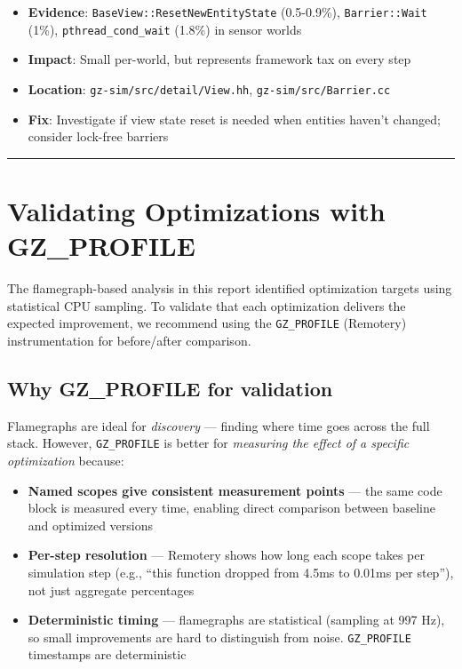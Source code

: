 \documentclass[11pt, a4paper]{article}
\providecommand{\tightlist}{%
  \setlength{\itemsep}{0pt}\setlength{\parskip}{0pt}}
\begin{document}
\begin{itemize}
\tightlist
\item
  \textbf{Evidence}: \texttt{BaseView::ResetNewEntityState} (0.5-0.9\%),
  \texttt{Barrier::Wait} (1\%), \texttt{pthread\_cond\_wait} (1.8\%) in
  sensor worlds
\item
  \textbf{Impact}: Small per-world, but represents framework tax on
  every step
\item
  \textbf{Location}: \texttt{gz-sim/src/detail/View.hh},
  \texttt{gz-sim/src/Barrier.cc}
\item
  \textbf{Fix}: Investigate if view state reset is needed when entities
  haven't changed; consider lock-free barriers
\end{itemize}

\begin{center}\rule{0.5\linewidth}{0.5pt}\end{center}

\section{Validating Optimizations with GZ\_PROFILE}\label{validating-optimizations}

The flamegraph-based analysis in this report identified optimization targets using statistical CPU sampling. To validate that each optimization delivers the expected improvement, we recommend using the \texttt{GZ\_PROFILE} (Remotery) instrumentation for before/after comparison.

\subsection{Why GZ\_PROFILE for validation}

Flamegraphs are ideal for \emph{discovery} --- finding where time goes across the full stack. However, \texttt{GZ\_PROFILE} is better for \emph{measuring the effect of a specific optimization} because:

\begin{itemize}
\tightlist
\item \textbf{Named scopes give consistent measurement points} --- the same code block is measured every time, enabling direct comparison between baseline and optimized versions
\item \textbf{Per-step resolution} --- Remotery shows how long each scope takes per simulation step (e.g., ``this function dropped from 4.5ms to 0.01ms per step''), not just aggregate percentages
\item \textbf{Deterministic timing} --- flamegraphs are statistical (sampling at 997 Hz), so small improvements are hard to distinguish from noise. \texttt{GZ\_PROFILE} timestamps are deterministic
\end{itemize}
\end{document}
